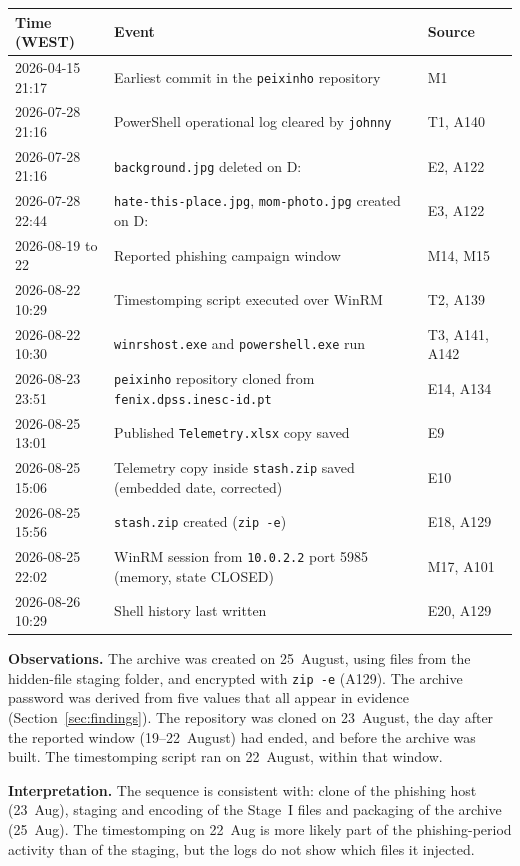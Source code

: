 \documentclass[11pt,a4paper,final,oneside]{article}
\begin{document}
\begin{center}
\small
\renewcommand{\arraystretch}{1.1}
\begin{tabularx}{\textwidth}{l l X}
\textbf{Time (WEST)} & \textbf{Event} & \textbf{Source} \\
\hline
2026-04-15 21:17 & Earliest commit in the \texttt{peixinho} repository & M1 \\
2026-07-28 21:16 & PowerShell operational log cleared by \texttt{johnny} & T1, A140 \\
2026-07-28 21:16 & \texttt{background.jpg} deleted on D: & E2, A122 \\
2026-07-28 22:44 & \texttt{hate-this-place.jpg}, \texttt{mom-photo.jpg} created on D: & E3, A122 \\
2026-08-19 to 22 & Reported phishing campaign window & M14, M15 \\
2026-08-22 10:29 & Timestomping script executed over WinRM & T2, A139 \\
2026-08-22 10:30 & \texttt{winrshost.exe} and \texttt{powershell.exe} run & T3, A141, A142 \\
2026-08-23 23:51 & \texttt{peixinho} repository cloned from \texttt{fenix.dpss.inesc-id.pt} & E14, A134 \\
2026-08-25 13:01 & Published \texttt{Telemetry.xlsx} copy saved & E9 \\
2026-08-25 15:06 & Telemetry copy inside \texttt{stash.zip} saved (embedded date, corrected) & E10 \\
2026-08-25 15:56 & \texttt{stash.zip} created (\texttt{zip -e}) & E18, A129 \\
2026-08-25 22:02 & WinRM session from \texttt{10.0.2.2} port 5985 (memory, state CLOSED) & M17, A101 \\
2026-08-26 10:29 & Shell history last written & E20, A129 \\
\end{tabularx}
\end{center}

\textbf{Observations.} The archive was created on 25~August, using files from the hidden-file staging folder, and encrypted with \texttt{zip -e} (A129). The archive password was derived from five values that all appear in evidence (Section~\ref{sec:findings}). The repository was cloned on 23~August, the day after the reported window (19--22~August) had ended, and before the archive was built. The timestomping script ran on 22~August, within that window.

\textbf{Interpretation.} The sequence is consistent with: clone of the phishing host (23~Aug), staging and encoding of the Stage~I files and packaging of the archive (25~Aug). The timestomping on 22~Aug is more likely part of the phishing-period activity than of the staging, but the logs do not show which files it injected.
\end{document}
